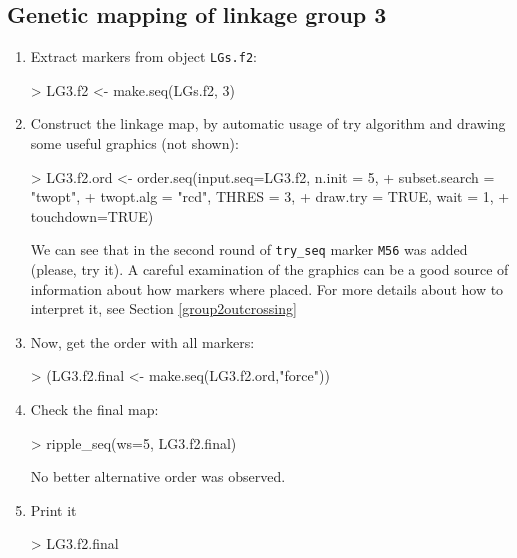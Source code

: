 \documentclass[letterpaper,12pt,oneside]{article}
\begin{document}
\subsection{Genetic mapping of linkage group 3}

\begin{enumerate}
\item Extract markers from object {\tt LGs.f2}:
\begin{Schunk}
\begin{Sinput}
> LG3.f2 <- make.seq(LGs.f2, 3)
\end{Sinput}
\end{Schunk}

\item Construct the linkage map, by automatic usage of try algorithm and drawing some useful graphics (not shown):
\begin{Schunk}
\begin{Sinput}
> LG3.f2.ord <- order.seq(input.seq=LG3.f2, n.init = 5, 
+                         subset.search = "twopt", 
+                         twopt.alg = "rcd", THRES = 3, 
+                         draw.try = TRUE, wait = 1,
+                         touchdown=TRUE)
\end{Sinput}
\end{Schunk}
We can see that in the second round of {\tt try_seq} marker {\tt M56} was added (please, try it). A careful examination of the graphics can be a good source of information about how markers where placed. For more details about how to interpret it, see Section \ref{group2outcrossing} 

\item Now, get the order with all markers:
\begin{Schunk}
\begin{Sinput}
> (LG3.f2.final <- make.seq(LG3.f2.ord,"force"))
\end{Sinput}
\end{Schunk}

\item Check the final map:
\begin{Schunk}
\begin{Sinput}
> ripple_seq(ws=5, LG3.f2.final)
\end{Sinput}
\end{Schunk}

No better alternative order was observed.

\item Print it
\begin{Schunk}
\begin{Sinput}
> LG3.f2.final
\end{Sinput}
\end{Schunk}
\end{enumerate}
\end{document}

